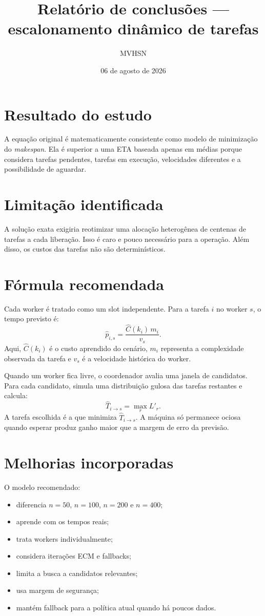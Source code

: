 \documentclass[12pt,a4paper]{article}
\title{Relatório de conclusões --- escalonamento dinâmico de tarefas}
\author{MVHSN}
\date{06 de agosto de 2026}
\begin{document}
\maketitle

\section{Resultado do estudo}
A equação original é matematicamente consistente como modelo de minimização do \emph{makespan}. Ela é superior a uma ETA baseada apenas em médias porque considera tarefas pendentes, tarefas em execução, velocidades diferentes e a possibilidade de aguardar.

\section{Limitação identificada}
A solução exata exigiria reotimizar uma alocação heterogênea de centenas de tarefas a cada liberação. Isso é caro e pouco necessário para a operação. Além disso, os custos das tarefas não são determinísticos.

\section{Fórmula recomendada}
Cada worker é tratado como um slot independente. Para a tarefa $i$ no worker $s$, o tempo previsto é:
\[
\widehat{p}_{i,s}=\frac{\widehat{C}(k_i)\,m_i}{v_s}.
\]
Aqui, $\widehat{C}(k_i)$ é o custo aprendido do cenário, $m_i$ representa a complexidade observada da tarefa e $v_s$ é a velocidade histórica do worker.

Quando um worker fica livre, o coordenador avalia uma janela de candidatos. Para cada candidato, simula uma distribuição gulosa das tarefas restantes e calcula:
\[
\widehat{T}_{i\rightarrow s}=\max_r L'_r.
\]
A tarefa escolhida é a que minimiza $\widehat{T}_{i\rightarrow s}$. A máquina só permanece ociosa quando esperar produz ganho maior que a margem de erro da previsão.

\section{Melhorias incorporadas}
O modelo recomendado:
\begin{itemize}
\item diferencia $n=50$, $n=100$, $n=200$ e $n=400$;
\item aprende com os tempos reais;
\item trata workers individualmente;
\item considera iterações ECM e fallbacks;
\item limita a busca a candidatos relevantes;
\item usa margem de segurança;
\item mantém fallback para a política atual quando há poucos dados.
\end{itemize}
\end{document}
